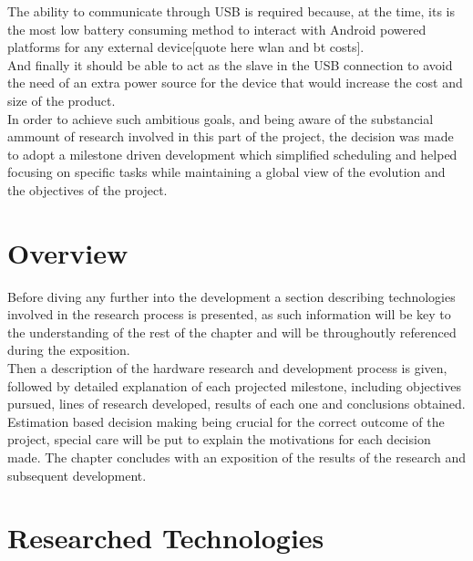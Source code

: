 	The ability to communicate through USB is required because, at the time, its is the most low battery consuming method to interact with Android powered platforms for any external device[quote here wlan and bt costs].\\

	And finally it should be able to act as the slave in the USB connection to avoid the need of an extra power source for the device that would increase the cost and size of the product.\\


	In order to achieve such ambitious goals, and being aware of the substancial ammount of research involved in this part of the project, the decision was made to adopt a milestone driven development which simplified scheduling and helped focusing on specific tasks while maintaining a global view of the evolution and the objectives of the project.\\

	\section{Overview}

	Before diving any further into the development a section describing technologies involved in the research process is presented, as such information will be key to the understanding of the rest of the chapter and will be throughoutly referenced during the exposition.\\

	Then a description of the hardware research and development process is given, followed by detailed explanation of each projected milestone, including objectives pursued, lines of research developed, results of each one and conclusions obtained. Estimation based decision making being crucial for the correct outcome of the project, special care will be put to explain the motivations for each decision made. The chapter concludes with an exposition of the results of the research and subsequent development.

	\section{Researched Technologies}

